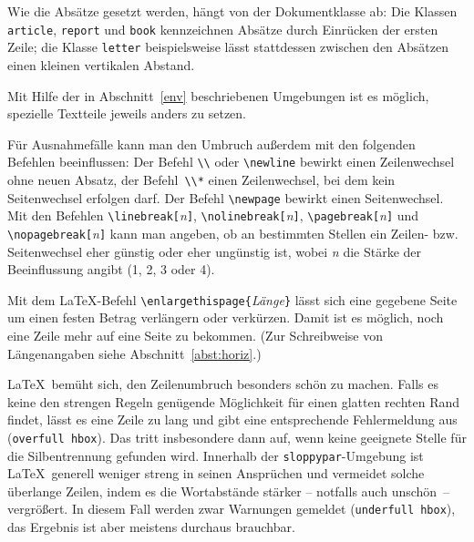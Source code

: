 Wie die Absätze gesetzt werden, hängt von der Dokumentklasse ab: 
Die Klassen 
\texttt{article}, \texttt{report} und \texttt{book} kennzeichnen
Absätze durch Einrücken der ersten Zeile;
die Klasse \texttt{letter} beispielsweise lässt stattdessen 
zwischen den Absätzen einen kleinen vertikalen Abstand.%


Mit Hilfe der in Abschnitt~\ref{env} beschriebenen Umgebungen ist
es möglich, spezielle Textteile jeweils anders zu setzen.
 
Für Ausnahmefälle kann man den Umbruch außerdem mit den
folgenden Befehlen beeinflussen:
Der Befehl \lstinline|\\| oder \lstinline|\newline| bewirkt einen
Zeilenwechsel ohne neuen Absatz, der Befehl~\lstinline|\\*| einen
Zeilenwechsel, bei dem kein Seitenwechsel erfolgen darf.
Der Befehl \lstinline|\newpage| bewirkt einen Seitenwechsel.
Mit den Befehlen
\lstinline|\linebreak[|\textit{n}\lstinline|]|,
\lstinline|\nolinebreak[|\textit{n}\lstinline|]|,
\lstinline|\pagebreak[|\textit{n}\lstinline|]|   und
\lstinline|\nopagebreak[|\textit{n}\lstinline|]|
kann man angeben, ob an bestimmten Stellen ein Zeilen- bzw.\ %
Seitenwechsel eher günstig oder eher ungünstig ist, wobei
\textit{n} die Stärke der Beeinflussung angibt (1, 2, 3 oder 4).

Mit dem \LaTeX-Befehl \lstinline:\enlargethispage{:\textit{Länge}\lstinline:}:
lässt sich eine gegebene Seite um einen festen Betrag
verlängern oder verkürzen. Damit ist es möglich, noch
eine Zeile mehr auf eine Seite zu bekommen. 
(Zur Schreibweise von Längenangaben siehe Abschnitt~\ref{abst:horiz}.)
 
\LaTeX\ bemüht sich, den Zeilenumbruch besonders schön zu
machen.  Falls es keine den strengen Regeln genügende
Möglichkeit für einen glatten rechten Rand findet, lässt es
eine Zeile zu lang und gibt eine entsprechende Fehlermeldung 
aus (\texttt{over\-full hbox}).
Das tritt insbesondere dann auf, wenn keine geeignete Stelle
für die Silbentrennung gefunden wird.
Innerhalb der \texttt{sloppypar}-Umgebung ist \LaTeX\ generell
weniger streng in seinen Ansprüchen und vermeidet solche
überlange Zeilen, indem es die Wortabstände stärker --
notfalls auch unschön~-- vergrößert.
In diesem Fall werden zwar Warnungen gemeldet (\texttt{under\-full
hbox}), das Ergebnis ist aber meistens durchaus brauchbar.
 
